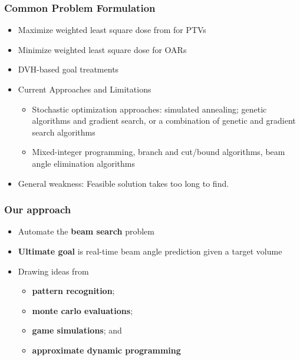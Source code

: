 \begin{frame}
\frametitle{Common Problem Formulation}
\begin{itemize}
	\item Maximize weighted least square dose from for PTVs
	\item Minimize weighted least square dose for OARs
	\item DVH-based goal treatments
\end{itemize}
	\hrulefill
	\begin{itemize}
		\item Current Approaches and Limitations
		\begin{itemize}
			\item Stochastic optimization approaches: simulated annealing; genetic algorithms and gradient search, or a combination of genetic and gradient search algorithms
			\item Mixed-integer programming, branch and cut/bound algorithms, beam angle elimination algorithms
		\end{itemize}
	\item General weakness: Feasible solution takes too long to find.
	\end{itemize}
\end{frame}

\begin{frame}
\frametitle{Our approach}
\begin{itemize}
	\item Automate the \textbf{beam search} problem
	\vspace{0.3cm}
	\item \textbf{Ultimate goal} is real-time beam angle prediction given a target volume 
	\vspace{0.3cm}
	\item Drawing ideas from 
	\vspace{0.3cm}
	\begin{itemize}
		\item \textbf{pattern recognition};
		\vspace{0.3cm}
		\item \textbf{monte carlo evaluations};
		\vspace{0.3cm}
		\item \textbf{game simulations}; and
		\vspace{0.3cm}
		\item \textbf{approximate dynamic programming}
	\end{itemize}
\end{itemize}
\end{frame}

